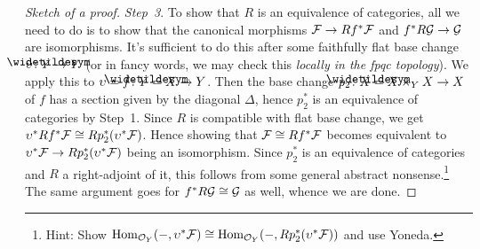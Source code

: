 \documentclass[a4paper,parskip=half,numbers=enddot, DIV=12]{scrreprt}
\begin{document}
\begin{proof}[Sketch of a proof]
	\emph{Step~3}. To show that $R$ is an equivalence of categories, all we need to do is to show that the canonical morphisms $\Ff\morphism Rf^*\Ff$ and $f^*R\Gg\morphism \Gg$ are isomorphisms. It's sufficient to do this after some faithfully flat base change $\upsilon\colon\snake{Y}\morphism Y$ (or in fancy words, we may check this \emph{locally in the fpqc topology}). We apply this to $\upsilon=f\colon\snake{Y}=X\morphism Y$. Then the base change $ p_2\colon\snake{X}=X\times_YX\morphism X$ of $f$ has a section given by the diagonal $\Delta$, hence $ p_2^*$ is an equivalence of categories by Step~1. Since $R$ is compatible with flat base change, we get $\upsilon^*Rf^*\mathcal{F}\cong R p_2^*(\upsilon^*\mathcal{F})$. Hence showing that $\mathcal{F}\cong Rf^*\mathcal{F}$ becomes equivalent to $\upsilon^*\Ff\morphism R p_2^*(\upsilon^*\Ff)$ being an isomorphism. Since $ p_2^*$ is an equivalence of categories and $R$ a right-adjoint of it, this follows from some general abstract nonsense.\footnote{Hint: Show $\operatorname{Hom}_{\mathcal{O}_Y}(-,\upsilon^*\mathcal{F})\cong \operatorname{Hom}_{\mathcal{O}_Y}(-,Rp_2^*(\upsilon^*\mathcal{F}))$ and use Yoneda.} The same argument goes for $f^*R\mathcal{G}\cong \mathcal{G}$ as well, whence we are done.
\end{proof}
\end{document}
